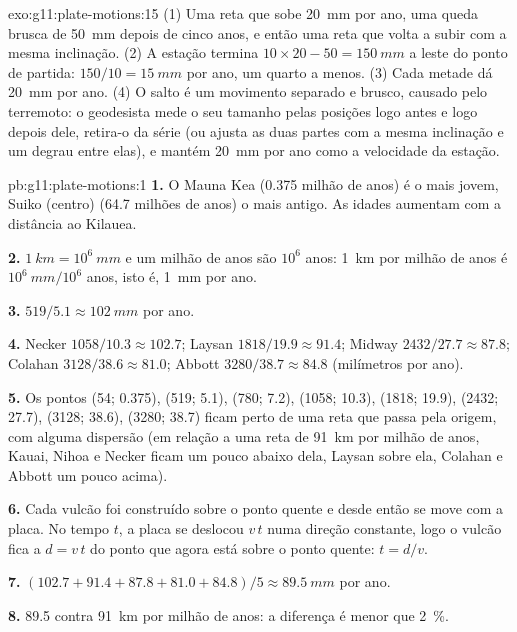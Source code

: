 \begin{solution}{exo:g11:plate-motions:15}
(1) Uma reta que sobe \qty{20}{mm} por ano, uma queda brusca de
\qty{50}{mm} depois de cinco anos, e então uma reta que volta a subir com a
mesma inclinação. (2) A estação termina $10 \times 20 - 50 = \qty{150}{mm}$
a leste do ponto de partida: $150/10 = \qty{15}{mm}$ por ano, um quarto a
menos. (3) Cada metade dá \qty{20}{mm} por ano. (4) O salto é um movimento
separado e brusco, causado pelo terremoto: o geodesista mede o seu tamanho
pelas posições logo antes e logo depois dele, retira-o da série (ou ajusta
as duas partes com a mesma inclinação e um degrau entre elas), e mantém
\qty{20}{mm} por ano como a velocidade da estação.
\end{solution}

\begin{solution}{pb:g11:plate-motions:1}
\textbf{1.} O Mauna Kea (\num{0.375} milhão de anos) é o mais jovem, Suiko
(centro) (\num{64.7} milhões de anos) o mais antigo. As idades aumentam com a
distância ao Kilauea.

\textbf{2.} $\qty{1}{km} = 10^6~\unit{mm}$ e um milhão de anos são $10^6$
anos: \qty{1}{km} por milhão de anos é $10^6~\unit{mm}/10^6$ anos, isto é,
\qty{1}{mm} por ano.

\textbf{3.} $519/5.1 \approx \qty{102}{mm}$ por ano.

\textbf{4.} Necker $1058/10.3 \approx 102.7$; Laysan $1818/19.9 \approx
91.4$; Midway $2432/27.7 \approx 87.8$; Colahan $3128/38.6 \approx 81.0$;
Abbott $3280/38.7 \approx 84.8$ (milímetros por ano).

\textbf{5.} Os pontos (54; 0.375), (519; 5.1), (780; 7.2), (1058; 10.3),
(1818; 19.9), (2432; 27.7), (3128; 38.6), (3280; 38.7) ficam perto de uma
reta que passa pela origem, com alguma dispersão (em relação a uma reta de
\qty{91}{km} por milhão de anos, Kauai, Nihoa e Necker ficam um pouco
abaixo dela, Laysan sobre ela, Colahan e Abbott um pouco acima).

\textbf{6.} Cada vulcão foi construído sobre o ponto quente e desde então se
move com a placa. No tempo $t$, a placa se deslocou $v\,t$ numa direção
constante, logo o vulcão fica a $d = v\,t$ do ponto que agora está sobre o
ponto quente: $t = d/v$.

\textbf{7.} $(102.7 + 91.4 + 87.8 + 81.0 + 84.8)/5 \approx \qty{89.5}{mm}$ por
ano.

\textbf{8.} 89.5 contra \qty{91}{km} por milhão de anos: a diferença é
menor que \qty{2}{\percent}.


\end{solution}
